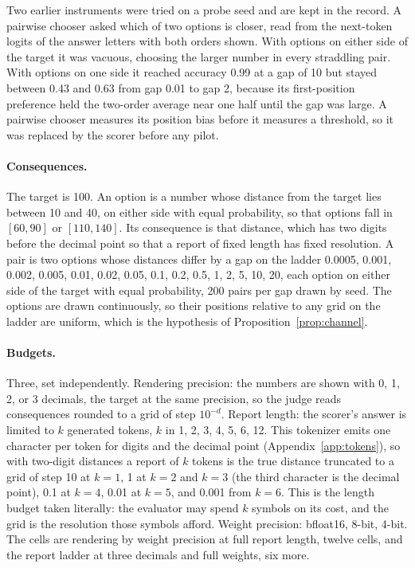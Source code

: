 \documentclass{article}
\theoremstyle{definition}
\theoremstyle{remark}
\begin{document}
Two earlier instruments were tried on a probe seed and are kept in the record.
A pairwise chooser asked which of two options is closer, read from the next-token logits of the answer letters with both orders shown.
With options on either side of the target it was vacuous, choosing the larger number in every straddling pair.
With options on one side it reached accuracy 0.99 at a gap of 10 but stayed between 0.43 and 0.63 from gap 0.01 to gap 2, because its first-position preference held the two-order average near one half until the gap was large.
A pairwise chooser measures its position bias before it measures a threshold, so it was replaced by the scorer before any pilot.

\paragraph{Consequences.}
The target is 100.
An option is a number whose distance from the target lies between 10 and 40, on either side with equal probability, so that options fall in $[60,90]$ or $[110,140]$. Its consequence is that distance, which has two digits before the decimal point so that a report of fixed length has fixed resolution.
A pair is two options whose distances differ by a gap on the ladder 0.0005, 0.001, 0.002, 0.005, 0.01, 0.02, 0.05, 0.1, 0.2, 0.5, 1, 2, 5, 10, 20, each option on either side of the target with equal probability, 200 pairs per gap drawn by seed.
The options are drawn continuously, so their positions relative to any grid on the ladder are uniform, which is the hypothesis of Proposition~\ref{prop:channel}.

\paragraph{Budgets.}
Three, set independently.
Rendering precision: the numbers are shown with 0, 1, 2, or 3 decimals, the target at the same precision, so the judge reads consequences rounded to a grid of step $10^{-d}$.
Report length: the scorer's answer is limited to $k$ generated tokens, $k$ in 1, 2, 3, 4, 5, 6, 12.
This tokenizer emits one character per token for digits and the decimal point (Appendix~\ref{app:tokens}), so with two-digit distances a report of $k$ tokens is the true distance truncated to a grid of step 10 at $k=1$, 1 at $k=2$ and $k=3$ (the third character is the decimal point), 0.1 at $k=4$, 0.01 at $k=5$, and 0.001 from $k=6$.
This is the length budget taken literally: the evaluator may spend $k$ symbols on its cost, and the grid is the resolution those symbols afford.
Weight precision: bfloat16, 8-bit, 4-bit.
The cells are rendering by weight precision at full report length, twelve cells, and the report ladder at three decimals and full weights, six more.
\end{document}
